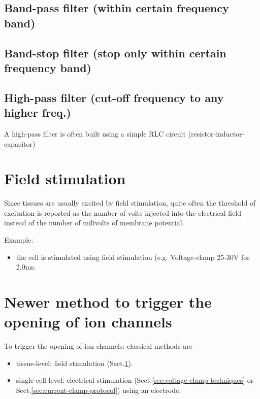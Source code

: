\subsection{Band-pass filter (within certain frequency band)}
\label{sec:band-pass-filter}

\subsection{Band-stop filter (stop only within certain frequency band)}
\label{sec:band-stop-filter}

\subsection{High-pass filter (cut-off frequency to any higher freq.)}
\label{sec:high-pass-filter}


A high-pass filter is often built using a simple RLC circuit
(resistor-inductor-capacitor)

\section{Field stimulation}
\label{sec:field-stimulation}

Since tissues are usually excited by field stimulation, quite often the
threshold of excitation is reported as the number of volts injected into the
electrical field instead of the number of milivolts of membrane potential. 

Example:
\begin{itemize}
  \item  the cell is stimulated using field stimulation (e.g. Voltage-clamp
  25-30V for 2.0ms.
\end{itemize}



\section{Newer method to trigger the opening of ion channels}

To trigger the opening of ion channels: classical methods are 
\begin{itemize}
  \item tissue-level: field stimulation (Sect.\ref{sec:field-stimulation}).
  
  \item single-cell level: electrical stimulation
  (Sect.\ref{sec:voltage-clamp-techniques} or Sect.\ref{sec:current-clamp-protocol}) using an electrode.
  
\end{itemize}

